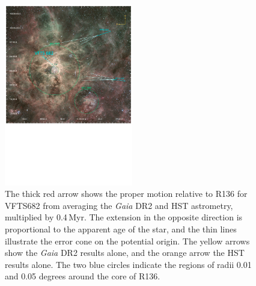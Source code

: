 \documentclass[a4paper,fleqn,usenatbib]{mnras}
\begin{document}

\begin{figure}%
  \centering
  \includegraphics[width=0.5\textwidth]{./figures/fig2}  
  \caption{The thick red arrow shows the proper motion
    relative to R136 for VFTS682 from averaging the \emph{Gaia} DR2 and HST
  astrometry, multiplied by 0.4\,Myr. The extension in the opposite
  direction is proportional to the apparent age of the star, and the
  thin lines illustrate the error cone on the potential origin. The
  yellow arrows show the \emph{Gaia} DR2 results alone, and the orange
  arrow the HST results alone. The two blue circles indicate the regions of radii 0.01 and 0.05
   degrees around the core of R136.}  
  \label{fig:main}
\end{figure}
\end{document}
